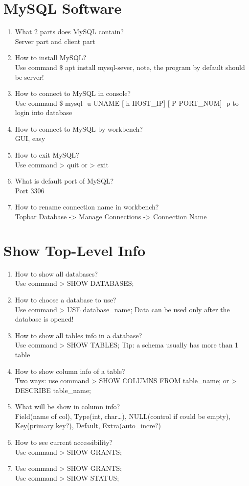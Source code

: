 \documentclass[10pt,a4paper,oneside]{article}
\begin{document}
\section{MySQL Software}
\begin{enumerate}[1.]
\item What 2 parts does MySQL contain?\\
Server part and client part
\item How to install MySQL? \\
Use command \$ apt install mysql-sever, note, the program by default should be server!
\item  How to connect to MySQL in console? \\
Use command \$ mysql -u UNAME [-h HOST\_IP] [-P PORT\_NUM] -p to login into database
\item  How to connect to MySQL by workbench? \\
GUI, easy
\item  How to exit MySQL? \\
Use command > quit or > exit
\item  What is default port of MySQL? \\
Port 3306
\item  How to rename connection name in workbench? \\
Topbar Database -> Manage Connections -> Connection Name
\end{enumerate}
\section{Show Top-Level Info}
\begin{enumerate}[1.]
\item  How to show all databases?  \\
Use command > SHOW DATABASES;
\item How to choose a database to use?   \\
Use command > USE database\_name; Data can be used only after the database is opened!
\item  How to show all tables info in a database?  \\
Use command > SHOW TABLES; Tip: a schema usually has more than 1 table
\item  How to show column info of a table?  \\
Two ways: use command > SHOW COLUMNS FROM table\_name; or > DESCRIBE table\_name;
\item What will be show in column info?   \\
Field(name of col), Type(int, char…), NULL(control if could be empty), Key(primary key?), Default, Extra(auto\_incre?)
\item  How to see current accessibility?  \\
Use command > SHOW GRANTS;
\item   Use command > SHOW GRANTS; \\
Use command > SHOW STATUS;
\end{enumerate}
\end{document}
